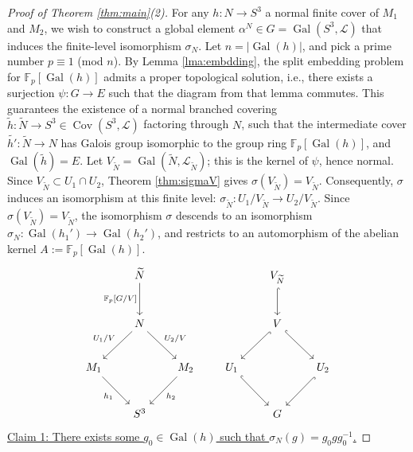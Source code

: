\documentclass{amsart}
\theoremstyle{plain}
\theoremstyle{definition}
\theoremstyle{plain}
\theoremstyle{plain}
\theoremstyle{plain}
\theoremstyle{remark}
\theoremstyle{remark}
\theoremstyle{plain}
\theoremstyle{definition}
\theoremstyle{plain}
\DeclareMathOperator{\Gal}{\mathrm{Gal}}
\DeclareMathOperator{\Cov}{\mathrm{Cov}}
\newcounter{main}
\theoremstyle{plain}
\theoremstyle{plain}
\numberwithin{equation}{section}
\begin{document}
\begin{proof}[Proof of Theorem \ref{thm:main}(2)]
For any $h: N \to S^3$ a normal finite cover of $M_1$ and $M_2$, we wish to construct a global element $\alpha^N \in G = \Gal(S^3, \mathcal{L})$ that induces the finite-level isomorphism $\sigma_N$. Let $n = |\Gal(h)|$, and pick a prime number $p \equiv 1$ (mod $n$). By Lemma \ref{lma:embdding}, the split embedding problem for $\mathbb{F}_p[\Gal(h)]$ admits a proper topological solution, i.e., there exists a surjection $\psi: G \to E$ such that the diagram from that lemma commutes. This guarantees the existence of a normal branched covering $\widetilde{h}: \widetilde{N} \to S^3 \in \Cov(S^3, \mathcal{L})$ factoring through $N$, such that the intermediate cover $\widetilde{h'}: \widetilde{N} \to N$ has Galois group isomorphic to the group ring $\mathbb{F}_p[\Gal(h)]$, and $\Gal(\widetilde{h}) = E$. Let $V_{\widetilde{N}} = \Gal(\widetilde{N}, \mathcal{L}_{\widetilde{N}})$; this is the kernel of $\psi$, hence normal. Since $V_{\widetilde{N}} \subset U_1 \cap U_2$, Theorem \ref{thm:sigmaV} gives $\sigma(V_{\widetilde{N}}) = V_{\widetilde{N}}$. Consequently, $\sigma$ induces an isomorphism at this finite level: $\sigma_{\widetilde{N}}: U_1/V_{\tilde N} \to U_2/V_{\tilde N}$. Since $\sigma(V_{\widetilde{N}}) = V_{\widetilde{N}}$, the isomorphism $\sigma$ descends to an isomorphism $\sigma_N: \Gal(h_1') \to \Gal(h_2')$, and restricts to an automorphism of the abelian kernel $A :=\mathbb{F}_p[\Gal(h)]$. 
\begin{equation}
\begin{tikzcd}[row sep=2.5em, column sep=2em]
& \widetilde{N} \arrow[d, "{\mathbb{F}_p[G/V]}"'] & & & V_{\widetilde{N}} \arrow[d, hook] \\
& N \arrow[dl, "{U_1/V}"'] \arrow[dr, "{U_2/V}"] & & & V \arrow[dl, hook] \arrow[dr, hook] \\
M_1 \arrow[dr, "h_1"'] & & M_2 \arrow[dl, "h_2"] & U_1 \arrow[dr, hook] & & U_2 \arrow[dl, hook] \\
& S^3 & & & G &
\end{tikzcd}
\end{equation}
\underline{Claim 1: There exists some $g_0 \in \Gal(h)$ such that $\sigma_N(g) = g_0gg_0^{-1}$.}

\medskip


\end{proof}
\end{document}
